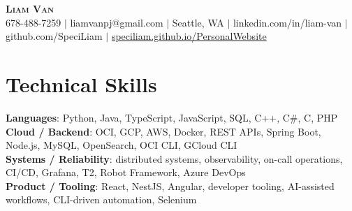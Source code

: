 \documentclass[letterpaper,11pt]{article}
\begin{document}

%
\begin{center}
    \textbf{\Huge \scshape Liam Van} \\ \vspace{1pt}
    \small 678-488-7259 $|$ \small {liamvanpj@gmail.com} $|$ Seattle, WA
 {{$|$ linkedin.com/in/liam-van} {$|$ github.com/SpeciLiam} {$|$ \href{https://speciliam.github.io/PersonalWebsite}{speciliam.github.io/PersonalWebsite}}}

\end{center}

\section{Technical Skills}
 \begin{itemize}[leftmargin=0.15in, label={}]
    \small{\item{
     \textbf{Languages}{: Python, Java, TypeScript, JavaScript, SQL, C++, C\#, C, PHP} \\
     \textbf{Cloud / Backend}{: OCI, GCP, AWS, Docker, REST APIs, Spring Boot, Node.js, MySQL, OpenSearch, OCI CLI, GCloud CLI} \\
     \textbf{Systems / Reliability}{: distributed systems, observability, on-call operations, CI/CD, Grafana, T2, Robot Framework, Azure DevOps} \\
     \textbf{Product / Tooling}{: React, NestJS, Angular, developer tooling, AI-assisted workflows, CLI-driven automation, Selenium} \\
    }}
 \end{itemize}
%
\end{document}
